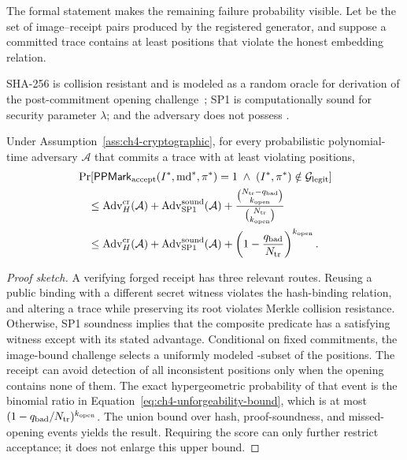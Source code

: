The formal statement makes the remaining failure probability visible.  Let
\PPLegitimateSet{} be the set of image--receipt pairs produced by the registered
generator, and suppose a committed trace contains at least \PPBadPositions{}
positions that violate the honest embedding relation.

\begin{assumption}
\label{ass:ch4-cryptographic}
SHA-256 is collision resistant and is modeled as a random oracle for derivation of
the post-commitment opening challenge~\cite{bellare1993randomoracle}; SP1 is computationally sound for security
parameter \(\lambda\); and the adversary does not possess \PPSecretKey{}.
\end{assumption}

\begin{theorem}
\label{thm:ch4-unforgeability}
Under Assumption~\ref{ass:ch4-cryptographic}, for every probabilistic
polynomial-time adversary \(\mathcal A\) that commits a trace with at least
\PPBadPositions{} violating positions,
\begin{equation}
\begin{aligned}
&\Pr\!\left[
  \mathsf{PPMark}_{\mathrm{accept}}(I^*,\mathrm{md}^*,\pi^*)=1
  \;\land\;
  (I^*,\pi^*)\notin\mathcal{G}_{\mathrm{legit}}
\right]\\
&\quad\leq
  \operatorname{Adv}^{\mathrm{cr}}_{H}(\mathcal A)
  +\operatorname{Adv}^{\mathrm{sound}}_{\mathrm{SP1}}(\mathcal A)
  +\frac{
      \binom{N_{\mathrm{tr}}-q_{\mathrm{bad}}}{k_{\mathrm{open}}}
    }{
      \binom{N_{\mathrm{tr}}}{k_{\mathrm{open}}}
    }\\
&\quad\leq
  \operatorname{Adv}^{\mathrm{cr}}_{H}(\mathcal A)
  +\operatorname{Adv}^{\mathrm{sound}}_{\mathrm{SP1}}(\mathcal A)
  +\left(1-\frac{q_{\mathrm{bad}}}{N_{\mathrm{tr}}}\right)^{k_{\mathrm{open}}}.
\end{aligned}
\label{eq:ch4-unforgeability-bound}
\end{equation}
\end{theorem}

\begin{proof}[Proof sketch]
A verifying forged receipt has three relevant routes.  Reusing a public binding
with a different secret witness violates the hash-binding relation, and altering a
trace while preserving its root violates Merkle collision resistance.  Otherwise,
SP1 soundness implies that the composite predicate has a satisfying witness except
with its stated advantage.  Conditional on fixed commitments, the image-bound
challenge selects a uniformly modeled \PPOpeningCount-subset of the
\PPSampleCount{} positions.  The receipt can avoid detection of all
\PPBadPositions{} inconsistent positions only when the opening contains none of
them.  The exact hypergeometric probability of that event is the binomial ratio in
Equation~\eqref{eq:ch4-unforgeability-bound}, which is at most
\((1-q_{\mathrm{bad}}/N_{\mathrm{tr}})^{k_{\mathrm{open}}}\).  The union bound over
hash, proof-soundness, and missed-opening events yields the result.  Requiring the
score can only further restrict acceptance; it does not enlarge this upper bound.
\end{proof}

